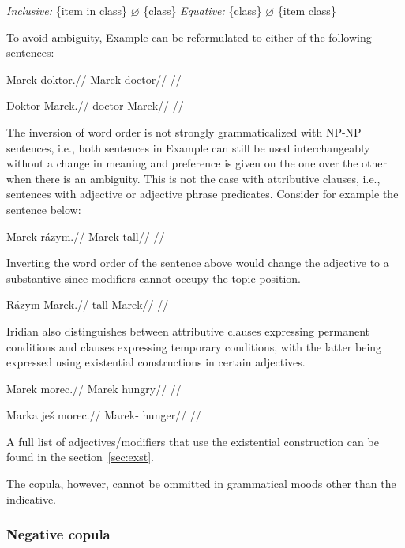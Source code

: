 \pex
\a \textit{Inclusive:} \{item in class\} $\varnothing$ \{class\}
\a \textit{Equative:} \{class\} $\varnothing$ \{item class\}
\xe

To avoid ambiguity, Example  can be reformulated to either of the following sentences:

\a
\begingl
\gla Marek doktor.//
\glb Marek doctor//
\glft {}//
\endgl

\a
\begingl
\gla Doktor Marek.//
\glb doctor Marek//
\glft {}//
\endgl

\xe

The inversion of word order is not strongly grammaticalized with NP-NP sentences, i.e., both sentences in Example  can still be used interchangeably without a change in meaning and preference is given on the one over the other when there is an ambiguity. This is not the case with attributive clauses, i.e., sentences with adjective or adjective phrase predicates. Consider for example the sentence below:

\pex
\begingl
\gla Marek rázym.//
\glb Marek tall//
\glft {}//
\endgl
\xe

Inverting the word order of the sentence above would change the adjective to a substantive since modifiers cannot occupy the topic position.

\pex
\begingl
\gla Rázym Marek.//
\glb tall Marek//
\glft {}//
\endgl
\xe

Iridian also distinguishes between attributive clauses expressing permanent conditions and clauses expressing temporary conditions, with the latter being expressed using existential constructions in certain adjectives.

\pex
\begingl
\gla *Marek morec.//
\glb Marek hungry//
\glft {}//
\endgl
\xe


\pex
\begingl
\gla Marka ješ morec.//
\glb Marek-\Pat{} \Exst{} hunger//
\glft {}//
\endgl
\xe

A full list of adjectives/modifiers that use the existential construction can be found in the section~\ref{sec:exst}.

The copula, however, cannot be ommitted in grammatical moods other than the indicative.

\subsubsection{Negative copula}

